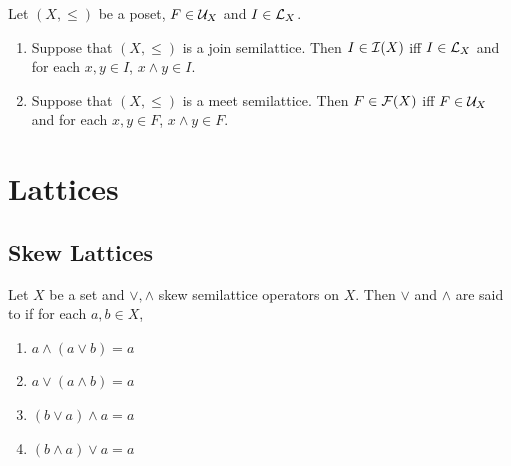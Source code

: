 \documentclass{book}
\begin{document}
	\begin{ex}
		Let $(X, \leq)$ be a poset, $F \in \mathcal{U}_X$ and $I \in \mathcal{L}_X$.
		\begin{enumerate}
			\item Suppose that $(X, \leq)$ is a join semilattice. Then $I \in \mathcal{I}(X)$ iff $I \in \mathcal{L}_X$ and for each $x,y \in I$, $x \wedge y \in I$.
			\item Suppose that $(X, \leq)$ is a meet semilattice. Then $F \in \mathcal{F}(X)$ iff $F \in \mathcal{U}_X$ and for each $x,y \in F$, $x \wedge y \in F$.
		\end{enumerate}
	\end{ex}

	
	
	
	
	
	
	
	
	
	
	
	
	
	
	
	
	
	
	
	
	
	
	
	
	
	
	
	
	
	
	
	
	
	
	
	
	
	
	
	\section{Lattices}
	
	\subsection{Skew Lattices}
	
	\begin{defn} 
		Let $X$ be a set and $\vee, \wedge$ skew semilattice operators on $X$. Then $\vee$ and $\wedge$ are said to   if for each $a,b \in X$,
		\begin{enumerate}
			\item $a \wedge (a \vee b) = a$
			\item $a \vee (a \wedge b) = a$
			\item $(b \vee a) \wedge a = a$
			\item $(b \wedge a) \vee a = a$
		\end{enumerate} 
	\end{defn}
	
\end{document}

